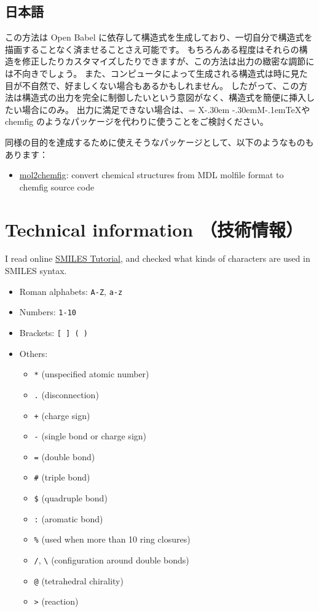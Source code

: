 \documentclass[12pt]{jsarticle}
\def\XyM{\ifnum\fam=-1\relax\fam=0\relax\fi\TestCount=\fam%
X\kern-.30em\smash{\raise.50ex\hbox{$\fam\TestCount\Upsilon$}}%
\kern-.30em{M}}
\def\XyMTeX{\XyM\kern-.1em\TeX}
\begin{document}
\subsection{日本語}

この方法は Open Babel に依存して構造式を生成しており、一切自分で構造式を描画することなく済ませることさえ可能です。
もちろんある程度はそれらの構造を修正したりカスタマイズしたりできますが、この方法は出力の緻密な調節には不向きでしょう。
また、コンピュータによって生成される構造式は時に見た目が不自然で、好ましくない場合もあるかもしれません。
したがって、この方法は構造式の出力を完全に制御したいという意図がなく、構造式を簡便に挿入したい場合にのみ。
出力に満足できない場合は、\XyMTeX や \textsf{chemfig} のようなパッケージを代わりに使うことをご検討ください。

同様の目的を達成するために使えそうなパッケージとして、以下のようなものもあります：
\begin{itemize}
\item \href{http://www.ctan.org/pkg/mol2chemfig}{\textsf{mol2chemfig}}: convert chemical structures from MDL molfile format to \textsf{chemfig} source code
\end{itemize}

\clearpage

\section{Technical information （技術情報）} \label{detail}

I read online \href{http://www.daylight.com/meetings/summerschool98/course/dave/smiles-intro.html}{SMILES Tutorial}, and checked what kinds of characters are used in SMILES syntax.
\begin{itemize}
\item Roman alphabets: \verb|A-Z|, \verb|a-z|
\item Numbers: \verb|1-10|
\item Brackets: \verb|[ ] ( )|
\item Others:
\begin{itemize}
\item \verb|*| (unspecified atomic number)
\item \verb|.| (disconnection)
\item \verb|+| (charge sign)
\item \verb|-| (single bond or charge sign)
\item \verb|=| (double bond)
\item \verb|#| (triple bond)
\item \verb|$| (quadruple bond)
\item \verb|:| (aromatic bond)
\item \verb|%| (used when more than 10 ring closures)
\item \verb|/|, \verb|\| (configuration around double bonds)
\item \verb|@| (tetrahedral chirality)
\item \verb|>| (reaction)
\end{itemize}
\end{itemize}
\end{document}
